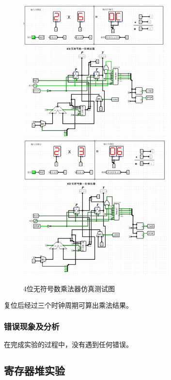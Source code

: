 \documentclass{article}
\begin{document}
    \begin{figure}[H]
    \centering
    \includegraphics[width=0.7\textwidth]{4.5.3.png}
    \includegraphics[width=0.7\textwidth]{4.5.4.png}
    \caption{4位无符号数乘法器仿真测试图}
    \end{figure}

    复位后经过三个时钟周期可算出乘法结果。

    \subsubsection{错误现象及分析}
    在完成实验的过程中，没有遇到任何错误。

    \subsection{寄存器堆实验}
\end{document}
